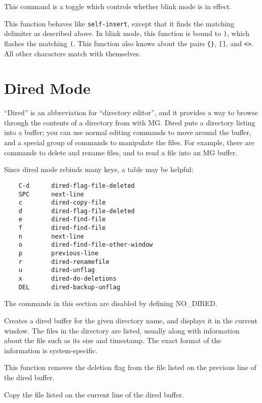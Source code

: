 \fbody This command is a toggle which controls whether blink mode is
in effect.

\fbody This function behaves like {\tt self-insert}, except that it
finds the matching delimiter as described above.  In blink mode, this
function is bound to \verb")", which flashes the matching \verb"(".  This
function also knows about the pairs \verb"{}", \verb"[]", and \verb"<>".
All other characters match with themselves.

\section{Dired Mode}

``Dired'' is an abbreviation for ``directory editor'', and it provides a way
to browse through the contents of a directory from with MG.  Dired puts
a directory listing into a buffer; you can use normal editing commands to
move around the buffer, and a special group of commands to manipulate
the files.  For example, there are commands to delete and rename files,
and to read a file into an MG buffer.

Since dired mode rebinds many keys, a table may be helpful:

\begin{verbatim}
    C-d      dired-flag-file-deleted
    SPC      next-line
    c        dired-copy-file
    d        dired-flag-file-deleted
    e        dired-find-file
    f        dired-find-file
    n        next-line
    o        dired-find-file-other-window
    p        previous-line
    r        dired-renamefile
    u        dired-unflag
    x        dired-do-deletions
    DEL      dired-backup-unflag
\end{verbatim}

The commands in this section are disabled by defining NO\_DIRED.

\fbody Creates a dired buffer for the given directory name, and displays
it in the current window.  The files
in the directory are listed, usually along with information about the
file such as its size and timestamp.  The exact format of the information
is system-specific.

\fbody This function removes the deletion flag from the file listed on
the previous line of the dired buffer.

\fbody Copy the file listed on the current line of the dired buffer.

